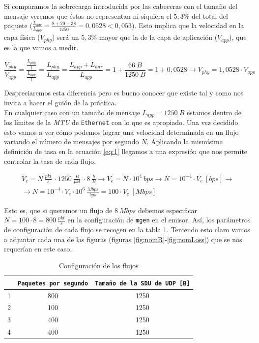 \documentclass[11pt]{article}
\begin{document}
        Si comparamos la sobrecarga introducida por las cabeceras con el tamaño del mensaje veremos que éstas no representan ni siquiera el $5,3\%$ del total del paquete ($\frac{L_{hdr}}{L_{app}} = \frac{8 + 20 + 38}{1250} = 0,0528 < 0,053$). Esto implica que la velocidad en la capa física ($V_{phy}$) será un $5,3\%$ mayor que la de la capa de aplicación ($V_{app}$), que es la que vamos a medir.

        $$\frac{V_{phy}}{V_{app}} = \frac{\frac{L_{phy}}{t}}{\frac{L_{app}}{t}} = \frac{L_{phy}}{L_{app}} = \frac{L_{app} + L_{hdr}}{L_{app}} = 1 + \frac{66\ B}{1250\ B} = 1 + 0,0528 \rightarrow V_{phy} = 1,0528 \cdot V_{app}$$

        Despreciaremos esta diferencia pero es bueno conocer que existe tal y como nos invita a hacer el guión de la práctica.\\

        En cualquier caso con un tamaño de mensaje $L_{app} = 1250\ B$ estamos dentro de los límites de la \textit{MTU} de \texttt{Ethernet} con lo que es apropiado. Una vez decidido esto vamos a ver cómo podemos lograr una velocidad determinada en un flujo variando el número de mensajes por segundo $N$. Aplicando la mismísima definición de tasa en la ecuación \ref{eq:1} llegamos a una expresión que nos permite controlar la tasa de cada flujo.

        \begin{multline} \label{eq:1}
            V_e = N\ \frac{pkt}{s}\ \cdot 1250\ \frac{B}{pkt}\ \cdot 8\ \frac{b}{B} \rightarrow V_e = N \cdot 10^4\ bps \rightarrow N = 10^{-4} \cdot V_e\ [bps] \rightarrow\\
            \rightarrow N = 10^{-4} \cdot V_e \cdot 10^6\ \frac{Mbps}{bps} = 100 \cdot V_e\ [Mbps]
        \end{multline}

        Esto es, que si queremos un flujo de $8\ Mbps$ debemos especificar $N = 100 \cdot 8 = 800\ \frac{pkt}{s}$ en la configuración de \texttt{mgen} en el emisor. Así, los parámetros de configuración de cada flujo se recogen en la tabla \ref{tab:conf}. Teniendo esto claro vamos a adjuntar cada una de las figuras (figuras \ref{fig:nomR}-\ref{fig:nomLoss}) que se nos requerían en este caso.

        \begin{table}
            \centering
            \begin{tabular}{|c|c|c|}
                \hline
                & \texttt{Paquetes por segundo} & \texttt{Tamaño de la SDU de UDP [B]}\\
                \hline
                1 & 800 & 1250\\
                \hline
                2 & 100 & 1250\\
                \hline
                3 & 400 & 1250\\
                \hline
                4 & 400 & 1250\\
                \hline
            \end{tabular}
            \caption{Configuración de los flujos}
            \label{tab:conf}
        \end{table}
\end{document}
